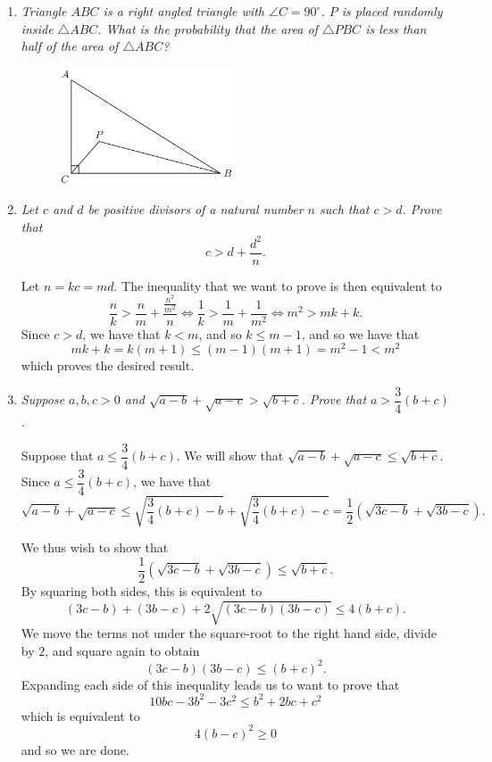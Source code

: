 \documentclass{article}
\begin{document}
\begin{enumerate}[1.]
\vspace{6pt}
\item %
{\itshape Triangle $ABC$ is a right angled triangle with $\angle C = 90^{\circ}$. $P$ is placed randomly inside $\triangle ABC$. What is the probability that the area of $\triangle PBC$ is less than half of the area of $\triangle ABC$?
\begin{figure}[h]
\centering
\includegraphics[width=0.5\textwidth]{../fig.jpg}
\end{figure}}


\vspace{6pt}
\item %
{\itshape Let $c$ and $d$ be positive divisors of a natural number $n$ such that $c > d$. Prove that $$c > d + \frac{d^2}{n}.$$}

Let $n = kc = md$. The inequality that we want to prove is then equivalent to
\[
	\frac{n}{k} > \frac{n}{m} + \frac{\frac{n^2}{m^2}}{n} \iff \frac{1}{k} > \frac{1}{m} + \frac{1}{m^2} \iff m^2 > mk + k.
\]
Since $c > d$, we have that $k < m$, and so $k \leq m - 1$, and so we have that
\[
	mk + k = k(m + 1) \leq (m - 1)(m + 1) = m^2 - 1 < m^2
\]
which proves the desired result.


\vspace{6pt}
\item %
{\itshape Suppose $a,b,c > 0$ and $\sqrt{a-b} +\sqrt{a-c} > \sqrt{b+c}$. Prove that $a > \dfrac{3}{4} (b+c)$.}

Suppose that $a \leq \dfrac{3}{4} (b + c)$. We will show that $\sqrt{a-b} +\sqrt{a-c} \leq \sqrt{b+c}$. Since $a \leq \dfrac{3}{4} (b + c)$, we have that
\[
	\sqrt{a-b} +\sqrt{a-c} \leq \sqrt{\frac{3}{4}(b + c) - b} + \sqrt{\frac{3}{4}(b + c) - c} = \frac{1}{2} \left(\sqrt{3c - b} + \sqrt{3b - c}\right).
\]

We thus wish to show that
\[
	\dfrac{1}{2} \left(\sqrt{3c - b} + \sqrt{3b - c}\right)  \leq \sqrt{b + c}.
\]
By squaring both sides, this is equivalent to
\[
	(3c - b) + (3b - c) + 2\sqrt{(3c - b)(3b - c)}  \leq 4(b + c).
\]
We move the terms not under the square-root to the right hand side, divide by $2$, and square again to obtain
\[
	(3c - b)(3b - c) \leq (b + c)^2.
\]
Expanding each side of this inequality leads us to want to prove that
\[
	10bc - 3b^2 - 3c^2 \leq b^2 + 2bc + c^2
\]
which is equivalent to
\[
	4(b - c)^2 \geq 0
\]
and so we are done.


\end{enumerate}
\end{document}
